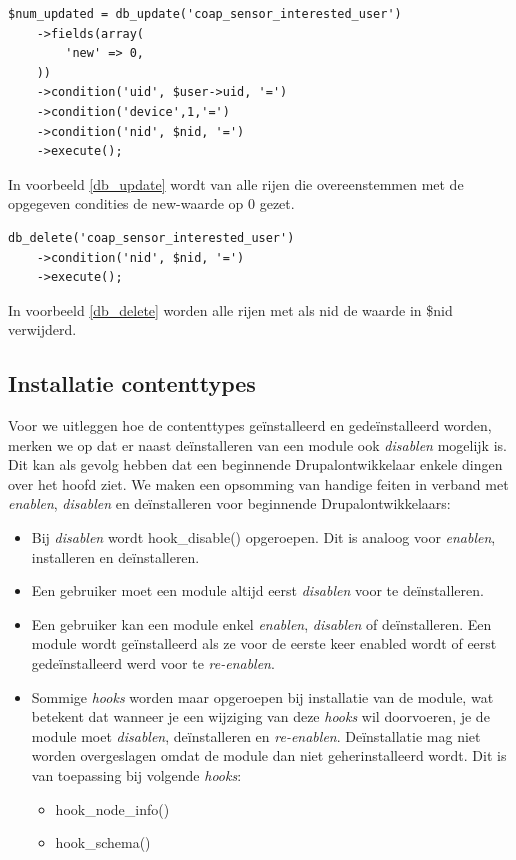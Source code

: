 \lstset{language=PHP}
\begin{lstlisting}[label=db_update,caption=Voorbeeld gebruik van db\_update]
$num_updated = db_update('coap_sensor_interested_user')
	->fields(array(
		'new' => 0,
	))
	->condition('uid', $user->uid, '=')
	->condition('device',1,'=')
	->condition('nid', $nid, '=')
	->execute();
\end{lstlisting}
In voorbeeld \ref{db_update} wordt van alle rijen die overeenstemmen met de opgegeven condities de new-waarde op 0 gezet. %

\lstset{language=PHP}
\begin{lstlisting}[label=db_delete,caption=Voorbeeld gebruik van db\_delete]
db_delete('coap_sensor_interested_user')
	->condition('nid', $nid, '=')
	->execute();
\end{lstlisting}
In voorbeeld \ref{db_delete} worden alle rijen met als nid de waarde in \$nid verwijderd. %

\subsection{Installatie contenttypes}
Voor we uitleggen hoe de contenttypes ge\"{i}nstalleerd en gede\"{i}nstalleerd worden, merken we op dat er naast de\"{i}nstalleren van een module ook \textit{disablen} mogelijk is. Dit kan als gevolg hebben dat een beginnende Drupalontwikkelaar enkele dingen over het hoofd ziet. We maken een opsomming van handige feiten in verband met \textit{enablen}, \textit{disablen} en de\"{i}nstalleren voor beginnende Drupalontwikkelaars:
\begin{itemize}
\item Bij \textit{disablen} wordt hook\_disable() opgeroepen. Dit is analoog voor \textit{enablen}, installeren en de\"{i}nstalleren.
\item Een gebruiker moet een module altijd eerst \textit{disablen} voor te de\"{i}nstalleren.
\item Een gebruiker kan een module enkel \textit{enablen}, \textit{disablen} of de\"{i}nstalleren. Een module wordt ge\"{i}nstalleerd als ze voor de eerste keer enabled wordt of eerst gede\"{i}nstalleerd werd voor te \textit{re-enablen}.
\item Sommige \textit{hooks} worden maar opgeroepen bij installatie van de module, wat betekent dat wanneer je een wijziging van deze \textit{hooks} wil doorvoeren, je de module moet \textit{disablen}, de\"{i}nstalleren en \textit{re-enablen}. De\"{i}nstallatie mag niet worden overgeslagen omdat de module dan niet geherinstalleerd wordt. Dit is van toepassing bij volgende \textit{hooks}:
\begin{itemize}
\item hook\_node\_info()
\item hook\_schema()
\end{itemize}
\end{itemize}

